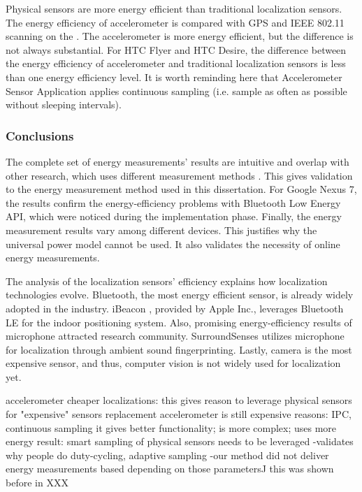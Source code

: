 
Physical sensors are more energy efficient than traditional localization sensors. The energy efficiency of accelerometer is compared with GPS and IEEE 802.11 scanning on the . The accelerometer is more energy efficient, but the difference is not always substantial. For HTC Flyer and HTC Desire, the difference between the energy efficiency of accelerometer and traditional localization sensors is less than one energy efficiency level. It is worth reminding here that Accelerometer Sensor Application applies continuous sampling (i.e. sample as often as possible without sleeping intervals).
	


\subsubsection{Conclusions}
The complete set of energy measurements' results are intuitive and overlap with other research, which uses different measurement methods \cite{constandache:localization} \cite{wang:eemss} \cite{chon:smartdc}. This gives validation to the energy measurement method used in this dissertation. For Google Nexus 7, the results confirm the energy-efficiency problems with Bluetooth Low Energy API, which were noticed during the implementation phase. Finally, the energy measurement results vary among different devices. This justifies why the universal power model cannot be used. It also validates the necessity of online energy measurements. 

The analysis of the localization sensors' efficiency explains how localization technologies evolve. Bluetooth, the most energy efficient sensor, is already widely adopted in the industry. iBeacon \cite{apple:ibeacon}, provided by Apple Inc.,  leverages Bluetooth LE for the indoor positioning system. Also, promising energy-efficiency results of microphone attracted research community. SurroundSenses \cite{azizyan:surroundsense} utilizes microphone for localization through ambient sound fingerprinting. Lastly, camera is the most expensive sensor, and thus, computer vision is not widely used for localization yet.
		
accelerometer cheaper localizations:
	this gives reason to leverage physical sensors for "expensive" sensors replacement
	accelerometer is still expensive
		reasons: IPC, continuous sampling
			it gives better functionality; is more complex; uses more energy
		result: smart sampling of physical sensors needs to be leveraged
			-validates why people do duty-cycling, adaptive sampling
			-our method did not deliver energy measurements based depending on those parameters^^
		this was shown before in XXX
		
